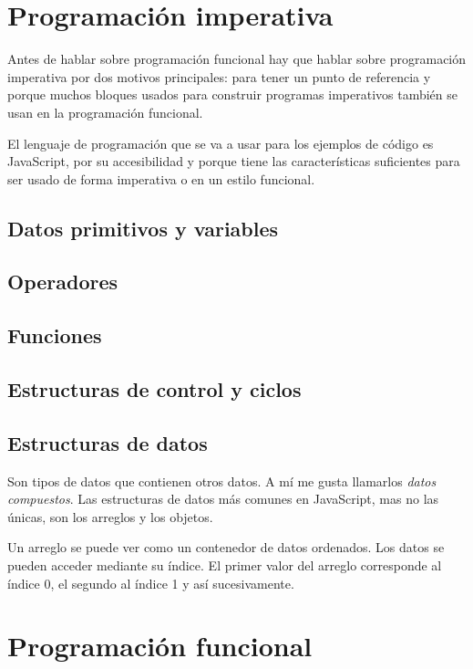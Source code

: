 \documentclass{article}
\begin{document}
\section*{Programación imperativa}
Antes de hablar sobre programación funcional hay que hablar sobre programación imperativa por dos motivos principales: para tener un punto de referencia y porque muchos bloques usados para construir programas imperativos también se usan en la programación funcional.

El lenguaje de programación que se va a usar para los ejemplos de código es JavaScript, por su accesibilidad y porque tiene las características suficientes para ser usado de forma imperativa o en un estilo funcional.\cite{why-js}

\subsection*{Datos primitivos y variables}

\subsection*{Operadores}

\subsection*{Funciones}

\subsection*{Estructuras de control y ciclos}

\subsection*{Estructuras de datos}
Son tipos de datos que contienen otros datos. A mí me gusta llamarlos \textit{datos compuestos}. Las estructuras de datos más comunes en JavaScript, mas no las únicas, son los arreglos y los objetos.

Un arreglo se puede ver como un contenedor de datos ordenados. Los datos se pueden acceder mediante su índice. El primer valor del arreglo corresponde al índice 0, el segundo al índice 1 y así sucesivamente.


\section*{Programación funcional}
\end{document}
